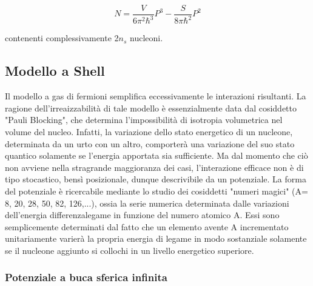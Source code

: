 \documentclass{article}
\begin{document}
\begin{equation}
    N= \frac{V}{6\pi^2 \hbar^3}P^3 - \frac{S}{8\pi\hbar^2}P^2
\end{equation}

contenenti complessivamente 2$n_s$ nucleoni.

\subsection{Modello a Shell}
Il modello a gas di fermioni semplifica eccessivamente le interazioni risultanti.
La ragione dell'irreaizzabilità di tale modello è essenzialmente data dal cosiddetto "Pauli Blocking", che determina
l'impossibilità di isotropia volumetrica nel volume del nucleo.
Infatti, la variazione dello stato energetico di un nucleone, determinata da un urto con un altro,
comporterà una variazione del suo stato quantico solamente se l'energia apportata sia sufficiente.
Ma dal momento che ciò non avviene nella stragrande maggioranza dei casi, l'interazione efficace non è di tipo
stocastico, bensì posizionale, dunque descrivibile da un potenziale.
La forma del potenziale è ricercabile mediante lo studio dei cosiddetti "numeri magici" (A= 8, 20, 28, 50, 82, 126,...), ossia la serie numerica determinata dalle variazioni dell'energia differenzalegame in funzione del numero atomico A.
Essi sono semplicemente determinati dal fatto che un elemento avente A incrementato unitariamente varierà la propria energia di legame in modo sostanziale solamente se il nucleone aggiunto si collochi in un livello energetico superiore.

\subsubsection{Potenziale a buca sferica infinita}
\end{document}
